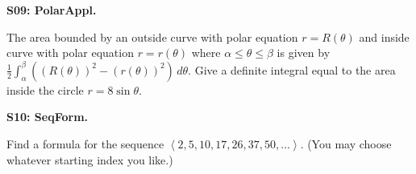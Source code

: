 \documentclass[12pt]{article}
\newcommand{\<}{\left\langle}
\renewcommand{\>}{\right\rangle}
\newcommand{\exerciseHeader}[4]{


  \vspace{0.5em}
  \textbf{#2}
  \vspace{0.5em}

}
\begin{document}
\begin{multicols}{2}
\exerciseHeader{2017 July 05}{S09: PolarAppl.}{
Use polar coordinates to express an arclength or area as a definite integral.
}{1/4}

The area bounded by an outside curve with polar equation \(r=R(\theta)\)
and inside curve with polar equation \(r=r(\theta)\) where
\(\alpha\leq\theta\leq\beta\) is given by
\(\frac{1}{2}\int_\alpha^\beta((R(\theta))^2-(r(\theta))^2)\,d\theta\).
Give a definite integral equal to the area inside the circle
\(r=8\sin\theta\).



%
%
%
%
%

%

%

%

\exerciseHeader{2017 July 11}{S10: SeqForm.}{
Define and use explicit and recursive formulas for sequences.
}{3/3}

Find a formula for the sequence \(\<2,5,10,17,26,37,50,\dots\>\).
(You may choose whatever starting index you like.)



%


\end{multicols}
\end{document}
